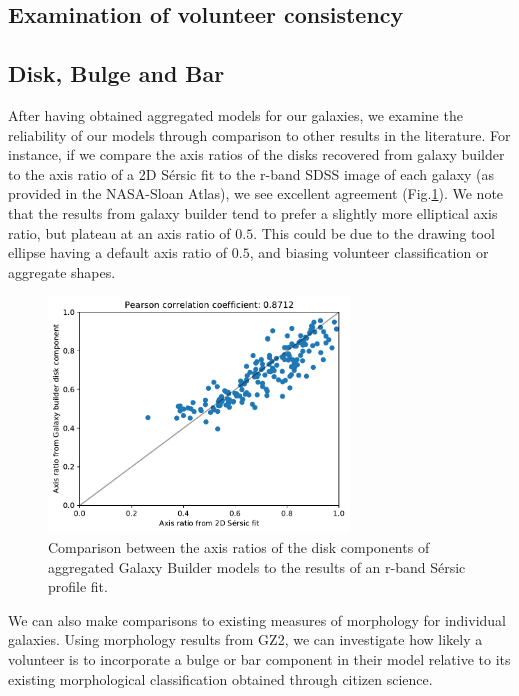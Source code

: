 \documentclass[../main.tex]{subfiles}
\begin{document}
\label{sec:results}
\subsection{Examination of volunteer consistency}


\subsection{Disk, Bulge and Bar}

After having obtained aggregated models for our galaxies, we examine the reliability of our models through comparison to other results in the literature. For instance, if we compare the axis ratios of the disks recovered from galaxy builder to the axis ratio of a 2D S\'ersic fit to the r-band SDSS image of each galaxy (as provided in the NASA-Sloan Atlas), we see excellent agreement (Fig.\ref{fig:ax_ratio_comparison}). We note that the results from galaxy builder tend to prefer a slightly more elliptical axis ratio, but plateau at an axis ratio of $0.5$. This could be due to the drawing tool ellipse having a default axis ratio of $0.5$, and biasing volunteer classification or aggregate shapes.

\begin{figure}
  \includegraphics[width=8cm]{images__results/GZBvsNSA_ax-ratio_SERSIC_BA.pdf}
  \caption{Comparison between the axis ratios of the disk components of aggregated Galaxy Builder models to the results of an r-band S\'ersic profile fit.}
  \label{fig:ax_ratio_comparison}
\end{figure}

We can also make comparisons to existing measures of morphology for individual galaxies. Using morphology results from GZ2, we can investigate how likely a volunteer is to incorporate a bulge or bar component in their model relative to its existing morphological classification obtained through citizen science.
\end{document}
